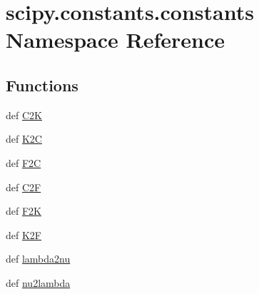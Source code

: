 \hypertarget{namespacescipy_1_1constants_1_1constants}{}\section{scipy.\+constants.\+constants Namespace Reference}
\label{namespacescipy_1_1constants_1_1constants}
\subsection*{Functions}
\begin{DoxyCompactItemize}
\item 
def \hyperlink{namespacescipy_1_1constants_1_1constants_a29165abf804edf0272f62a64275c0acd}{C2\+K}
\item 
def \hyperlink{namespacescipy_1_1constants_1_1constants_a1a4c19921cc87bce14133f6286801003}{K2\+C}
\item 
def \hyperlink{namespacescipy_1_1constants_1_1constants_ae9b80f4ac9d271b6f4d0042ef2a43293}{F2\+C}
\item 
def \hyperlink{namespacescipy_1_1constants_1_1constants_a367da496351d44a3490c53bbc2d32015}{C2\+F}
\item 
def \hyperlink{namespacescipy_1_1constants_1_1constants_ae0a2d294e93aaa8b82ab45429d2c3d30}{F2\+K}
\item 
def \hyperlink{namespacescipy_1_1constants_1_1constants_a5525fa2faa811cb6c657c51dea762f28}{K2\+F}
\item 
def \hyperlink{namespacescipy_1_1constants_1_1constants_a57a781454314f68910dc9ac8e0f7ba41}{lambda2nu}
\item 
def \hyperlink{namespacescipy_1_1constants_1_1constants_acee678112199462670644a04c85c7959}{nu2lambda}
\end{DoxyCompactItemize}
